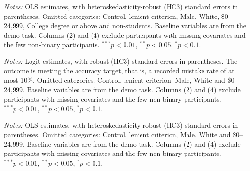 \documentclass[12pt, letterpaper]{article}
\begin{document}
\begin{table}[p]
\centering
\begin{threeparttable}
\scriptsize\renewcommand{\arraystretch}{0.85}

\begin{tablenotes}[flushleft]
\scriptsize
\item \textit{Notes:} OLS estimates, with heteroskedasticity-robust (HC3) standard errors in parentheses. Omitted categories: Control, lenient criterion, Male, White, \$0--24,999, College degree or above and non-students. Baseline variables are from the demo task. Columns (2) and (4) exclude participants with missing covariates and the few non-binary participants. $^{***}p<0.01$, $^{**}p<0.05$, $^{*}p<0.1$.
\end{tablenotes}
\end{threeparttable}
\caption{Treatment effects on sets completed (lab sample)}\label{tab:reg-sets-lab}
\end{table}

\begin{table}[p]
\centering
\begin{threeparttable}
\scriptsize\renewcommand{\arraystretch}{0.85}

\begin{tablenotes}[flushleft]
\scriptsize
\item \textit{Notes:} Logit estimates, with robust (HC3) standard errors in parentheses. The outcome is meeting the accuracy target, that is, a recorded mistake rate of at most 10\%. Omitted categories: Control, lenient criterion, Male, White and \$0--24,999. Baseline variables are from the demo task. Columns (2) and (4) exclude participants with missing covariates and the few non-binary participants. $^{***}p<0.01$, $^{**}p<0.05$, $^{*}p<0.1$.
\end{tablenotes}
\end{threeparttable}
\caption{Treatment effects on accuracy target achievement likelihood (class sample)}\label{tab:reg-target-class}
\end{table}

\begin{table}[p]
\centering
\begin{threeparttable}
\scriptsize\renewcommand{\arraystretch}{0.85}

\begin{tablenotes}[flushleft]
\scriptsize
\item \textit{Notes:} OLS estimates, with heteroskedasticity-robust (HC3) standard errors in parentheses. Omitted categories: Control, lenient criterion, Male, White and \$0--24,999. Baseline variables are from the demo task. Columns (2) and (4) exclude participants with missing covariates and the few non-binary participants. $^{***}p<0.01$, $^{**}p<0.05$, $^{*}p<0.1$.
\end{tablenotes}
\end{threeparttable}
\caption{Treatment effects on mistake rates (class sample)}\label{tab:reg-mistakes-class}
\end{table}
\end{document}
